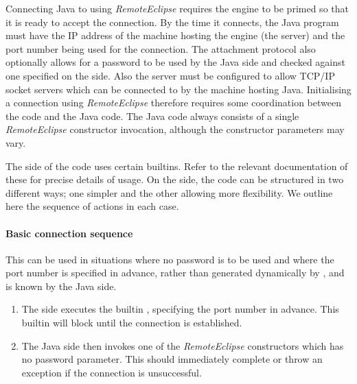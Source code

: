 Connecting Java to {\eclipse} using {\it RemoteEclipse} requires the
{\eclipse} engine to be primed so that it is ready to accept the
connection.  By the time it connects, the Java program must have the
IP address of the machine hosting the {\eclipse} engine (the server)
and the port number being used for the connection. The attachment
protocol also optionally allows for a password to be used by the Java
side and checked against one specified on the {\eclipse} side. Also
the server must be configured to allow TCP/IP socket servers which can
be connected to by the machine hosting Java. Initialising a connection
using {\it RemoteEclipse} therefore requires some coordination between
the {\eclipse} code and the Java code. The Java code always consists
of a single {\it RemoteEclipse} constructor invocation, although the
constructor parameters may vary. 

The {\eclipse} side of the code uses certain builtins. Refer to the
relevant documentation of these for precise details of usage. On the
{\eclipse} side, the code can be structured in two different ways; one
simpler and the other allowing more flexibility. We outline here the
sequence of actions in each case.

\paragraph{Basic connection sequence}
This can be used in situations where no password is to be used and
where the port number is specified in advance, rather than generated
dynamically by {\eclipse}, and is known by the Java side.
\begin{enumerate}
  \item The {\eclipse} side executes the builtin , specifying the port number in advance. This
	builtin will block until the connection is established.  

  \item The Java side then invokes one of the {\it RemoteEclipse}
	constructors which has no password parameter. This should
	immediately complete or throw an exception if the connection
	is unsuccessful.

\end{enumerate}
